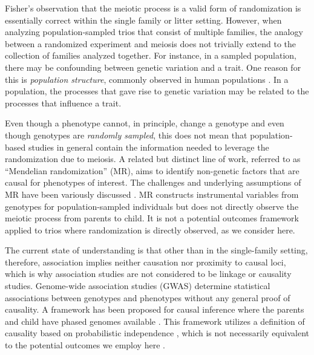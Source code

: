 \documentclass[12pt]{extarticle}
\begin{document}
Fisher's observation that the meiotic process is a valid form of randomization is essentially correct within the single family or litter setting. However, when analyzing population-sampled trios that consist of multiple families, the analogy between a randomized experiment and meiosis does not trivially extend to the collection of families analyzed together. For instance, in a sampled population, there may be confounding between genetic variation and a trait. One reason for this is \textit{population structure}, commonly observed in human populations \citep{hao2019}. In a population, the processes that gave rise to genetic variation may be related to the processes that influence a trait. 

Even though a phenotype cannot, in principle, change a genotype and even though genotypes are \textit{randomly sampled}, this does not mean that population-based studies in general contain the information needed to leverage the randomization due to meiosis. A related but distinct line of work, referred to as ``Mendelian randomization'' (MR), aims to identify non-genetic factors that are causal for phenotypes of interest. The challenges and underlying assumptions of MR have been variously discussed \citep{smith2004, nitsch2006, bochud2008}. MR constructs instrumental variables from genotypes for population-sampled individuals but does not directly observe the meiotic process from parents to child. It is not a potential outcomes framework applied to trios where randomization is directly observed, as we consider here. 

The current state of understanding is that other than in the single-family setting, therefore, association implies neither causation nor proximity to causal loci, which is why association studies are not considered to be linkage or causality studies. Genome-wide association studies (GWAS) determine statistical associations between genotypes and phenotypes without any general proof of causality. A framework has been proposed for causal inference where the parents and child have phased genomes available \citep{bates2020}. This framework utilizes a definition of causality based on probabilistic independence \citep{pearl2009}, which is not necessarily equivalent to the potential outcomes we employ here \citep{imbens2015}. %
\end{document}
